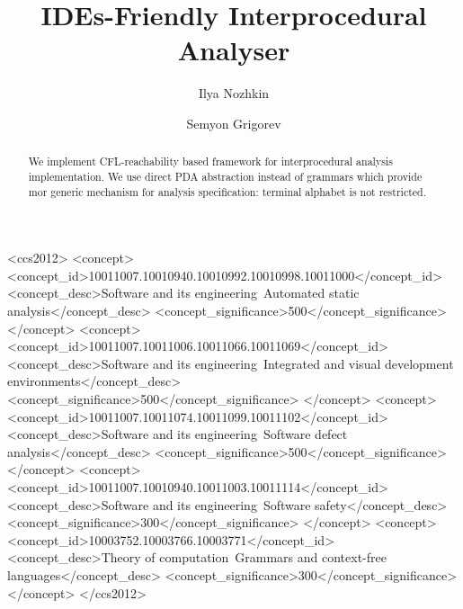 \documentclass[sigconf]{acmart}
\begin{document}
\title[IDEs-Friendly Interprocedural Analyser]{IDEs-Friendly Interprocedural Analyser}

\author{Ilya Nozhkin}

\author{Semyon Grigorev}

\begin{abstract}
We implement CFL-reachability based framework for interprocedural analysis implementation.
We use direct PDA abstraction instead of grammars which provide mor generic mechanism for analysis specification: terminal alphabet is not restricted.
\end{abstract}


\begin{CCSXML}
<ccs2012>
<concept>
<concept_id>10011007.10010940.10010992.10010998.10011000</concept_id>
<concept_desc>Software and its engineering~Automated static analysis</concept_desc>
<concept_significance>500</concept_significance>
</concept>
<concept>
<concept_id>10011007.10011006.10011066.10011069</concept_id>
<concept_desc>Software and its engineering~Integrated and visual development environments</concept_desc>
<concept_significance>500</concept_significance>
</concept>
<concept>
<concept_id>10011007.10011074.10011099.10011102</concept_id>
<concept_desc>Software and its engineering~Software defect analysis</concept_desc>
<concept_significance>500</concept_significance>
</concept>
<concept>
<concept_id>10011007.10010940.10011003.10011114</concept_id>
<concept_desc>Software and its engineering~Software safety</concept_desc>
<concept_significance>300</concept_significance>
</concept>
<concept>
<concept_id>10003752.10003766.10003771</concept_id>
<concept_desc>Theory of computation~Grammars and context-free languages</concept_desc>
<concept_significance>300</concept_significance>
</concept>
</ccs2012>
\end{CCSXML}

\end{document}
